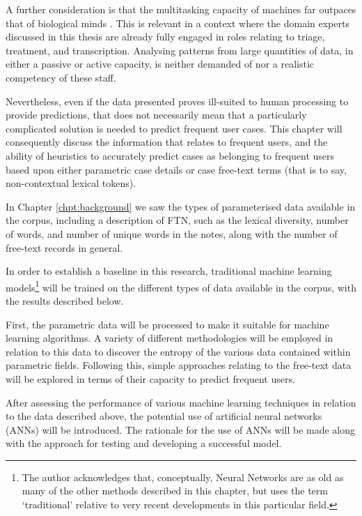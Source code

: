  A further consideration is that the multitasking capacity of machines far outpaces that of biological minds  \cite{singh2013designing,cherif2018multitasking} . This is relevant in a context where the domain experts discussed in this thesis are already fully engaged in roles relating to triage, treatment, and transcription. Analysing patterns from large quantities of data, in either a passive or active capacity, is neither demanded of nor a realistic competency of these staff.  
 
Nevertheless, even if the data presented proves ill-suited to human processing to provide predictions, that does not necessarily mean that a particularly complicated solution is needed to predict frequent user cases. This chapter will consequently discuss the information that relates to frequent users, and the ability of heuristics to accurately predict cases as belonging to frequent users based upon either parametric case details or case free-text terms (that is to say, non-contextual lexical tokens). 

In Chapter \ref{chpt:background} we saw the types of parameterised data available in the corpus, including a description of FTN, such as the lexical diversity, number of words, and number of unique words in the notes, along with the number of free-text records in general. 

In order to establish a baseline in this research, traditional machine learning models\footnote{The author acknowledges that, conceptually, Neural Networks are as old as many of the other methods described in this chapter, but uses the term `traditional' relative to very recent developments in this particular field.} will be trained on the different types of data available in the corpus, with the results described below. 

First, the parametric data will be processed to make it suitable for machine learning algorithms. A variety of different methodologies will be employed in relation to this data to discover the entropy of the various data contained within parametric fields. Following this, simple approaches relating to the free-text data will be explored in terms of their capacity to predict frequent users. 

After assessing the performance of various machine learning techniques in relation to the data described above, the potential use of artificial neural networks (ANNs) will be introduced. The rationale for the use of ANNs will be made along with the approach for testing and developing a successful model. 

